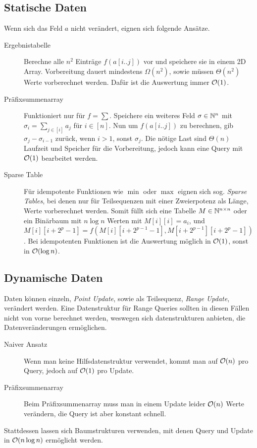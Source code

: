 \subsection{Statische Daten}
Wenn sich das Feld \(a\) nicht verändert, eignen sich folgende Ansätze.
\begin{description}
    \item[Ergebnistabelle] Berechne alle \(n^2\) Einträge \(f(a[i..j])\) vor und speichere sie in einem 2D Array.
        Vorbereitung dauert mindestens \(\Omega(n^2)\), sowie müssen \(\Theta(n^2)\) Werte vorberechnet werden.
        Dafür ist die Auswertung immer \(\mathcal O(1)\).

    \item[Präfixsummenarray] Funktioniert nur für \(f = \sum\).
        Speichere ein weiteres Feld \(\sigma \in \mathbb N^n\) mit \(\sigma_i = \sum_{j \in [i]}a_j\) für \(i \in [n]\).
        Nun um \(f(a[i..j])\) zu berechnen, gib \(\sigma_j - \sigma_{i-1}\) zurück, wenn \(i > 1\), sonst \(\sigma_j\).
        Die nötige Last sind \(\Theta(n)\) Laufzeit und Speicher für die Vorbereitung, jedoch kann eine Query mit \(\mathcal O(1)\) bearbeitet werden.

    \item[Sparse Table]
        Für idempotente Funktionen wie \(\min\) oder \(\max\) eignen sich sog. \emph{Sparse Tables}, bei denen nur für Teilsequenzen mit einer Zweierpotenz als Länge, Werte vorberechnet werden.
        Somit füllt sich eine Tabelle \(M \in \mathbb N^{n \times n}\) oder ein Binärbaum mit \(n \log n\) Werten mit \(M[i][i] = a_i\), und \(M[i][i + 2^p - 1] = f(M[i][i + 2^{p-1} - 1], M[i + 2^{p-1}][i + 2^p - 1])\).
        Bei idempotenten Funktionen ist die Auswertung möglich in \(\mathcal O(1)\), sonst in \(\mathcal O(\log n)\).
\end{description}

\subsection{Dynamische Daten}
Daten können einzeln, \emph{Point Update}, sowie als Teilsequenz, \emph{Range Update}, verändert werden.
Eine Datenstruktur für Range Queries sollten in diesen Fällen nicht von vorne berechnet werden, weswegen sich datenstrukturen anbieten, die Datenveränderungen ermöglichen.
\begin{description}
    \item[Naiver Ansatz] Wenn man keine Hilfsdatenstruktur verwendet, kommt man auf \(\mathcal O(n)\) pro Query, jedoch auf \(\mathcal O(1)\) pro Update.

    \item[Präfixsummenarray] Beim Präfixsummenarray muss man in einem Update leider \(\mathcal O(n)\) Werte verändern, die Query ist aber konstant schnell.
\end{description}
Stattdessen lassen sich Baumstrukturen verwenden, mit denen Query und Update in \(\mathcal O(n \log n)\) ermöglicht werden.

